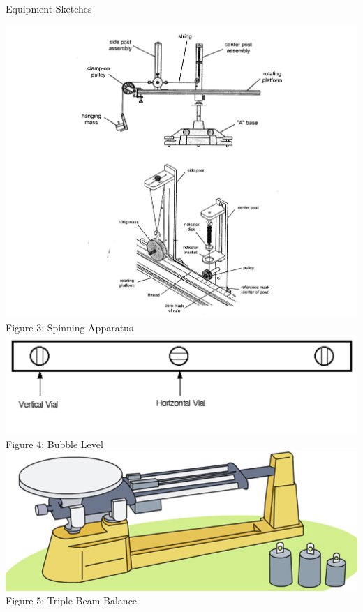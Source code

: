 \documentclass[12pt]{report}
\begin{document}
\begin{flushleft}
\begin{large}
Equipment Sketches \\
\end{large}
\begin{center}
  \includegraphics[scale=0.2]{equipment1}
  Figure 3: Spinning Apparatus
  \includegraphics[scale=0.8]{basiclevel}
  Figure 4: Bubble Level
  \includegraphics[scale=0.4]{triplebeam}
  Figure 5: Triple Beam Balance
\end{center}
\newpage
\begin{large}
\end{large}

\end{flushleft}
\end{document}
